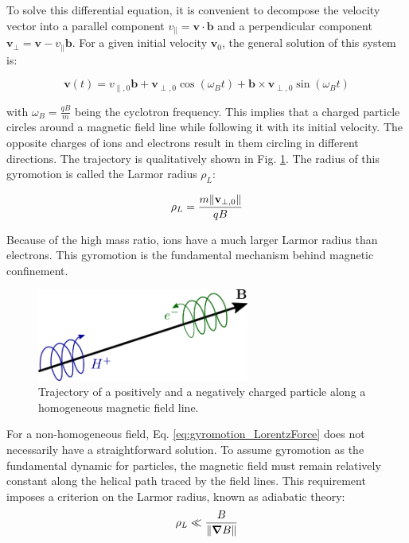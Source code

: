 To solve this differential equation, it is convenient to decompose the velocity vector into a parallel component \( v_\parallel = \textbf{v}\cdot\textbf{b} \) and a perpendicular component \( \textbf{v}_\perp = \textbf{v} - v_\parallel \textbf{b} \). For a given initial velocity \(\mathbf{v}_0\), the general solution of this system is:

\begin{equation}
	\mathbf{v}(t) = v_{\parallel,0}\mathbf{b} + \mathbf{v}_{\perp,0}\cos(\omega_B t) + \mathbf{b} \times \mathbf{v}_{\perp,0} \sin(\omega_B t)
\end{equation}

with \(\omega_B = \frac{qB}{m}\) being the cyclotron frequency. This implies that a charged particle circles around a magnetic field line while following it with its initial velocity. The opposite charges of ions and electrons result in them circling in different directions. The trajectory is qualitatively shown in Fig. \ref{fig:TokamakBasics_gyromotion}. The radius of this gyromotion is called the Larmor radius \(\rho_L\):

\begin{equation}
	\rho_L = \frac{m\norm{\mathbf{v}_{\perp,0}}}{qB}
\end{equation}

Because of the high mass ratio, ions have a much larger Larmor radius than electrons. This gyromotion is the fundamental mechanism behind magnetic confinement. \newline 


\begin{figure}[H]
	\centering
	\includegraphics[width=0.62\textwidth]{schemes/gyromotion.png}
	\caption{Trajectory of a positively and a negatively charged particle along a homogeneous magnetic field line.}
	\label{fig:TokamakBasics_gyromotion}
\end{figure}


For a non-homogeneous field, Eq. \ref{eq:gyromotion_LorentzForce} does not necessarily have a straightforward solution. To assume gyromotion as the fundamental dynamic for particles, the magnetic field must remain relatively constant along the helical path traced by the field lines. This requirement imposes a criterion on the Larmor radius, known as adiabatic theory:
\begin{equation}
	\label{eq:intro_adiabaticCondition}
	\rho_L \ll \frac{B}{\norm{\grad B}}
\end{equation}


